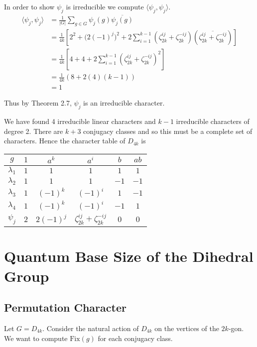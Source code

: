 In order to show $\psi_j$ is irreducible we compute $\langle \psi_j, \psi_j \rangle$.
\begin{align*}
    \langle \psi_j, \psi_j \rangle &= \frac{1}{|G|}\sum_{g \in G} \psi_j(g) \overline{\psi_j(g)} \\
                           &= \frac{1}{4k}\left[2^2 + \bigl(2(-1)^j\bigr)^2 + 
                               2\sum_{i=1}^{k-1}\left(\zeta_{2k}^{ij} + 
                               \zeta_{2k}^{-ij}\right)\left(\overline{\zeta_{2k}^{ij} + 
                       \zeta_{2k}^{-ij}}\right)\right] \\
%                             
               &= \frac{1}{4k}\left[ 4 + 4 + 2\sum_{i=1}^{k-1}\left(\zeta_{2k}^{ij} + \zeta_{2k}^{-ij}\right)^2 
               \right] \\
               &= \frac{1}{4k}(8 + 2(4)(k-1)) \\
               &= 1 \end{align*}

Thus by Theorem 2.7, $\psi_j$ is an irreducible character. 

We have found 4 irreducible linear characters and $k-1$ irreducible characters of degree 2. There are $k+3$ 
conjugacy classes and so this must be a complete set of characters. Hence the character table of $D_{4k}$ is 

\begin{center}
\begin{tabular}{c|ccccc}
    $g$ &$1$ & $a^k$ & $a^i$ & $b$ & $ab$ \\ \hline
    $\lambda_1$ & $1$ & $1$ & $1$ & $1$ & $1$ \\
    $\lambda_2$ & $1$ & $1$ & $1$ & $-1$ & $-1$ \\
    $\lambda_3$ & $1$ & $(-1)^k$ & $(-1)^i$ & $1$ & $-1$ \\
    $\lambda_4$ & $1$ & $(-1)^k$ & $(-1)^i$ & $-1$ & $1$ \\
    $\psi_j$ & $2$ & $2(-1)^j$ & $\zeta_{2k}^{ij} + \zeta_{2k}^{-ij}$ & $0$ & $0$
\end{tabular}
\end{center}

\section{Quantum Base Size of the Dihedral Group}




\subsection{Permutation Character}
Let $G = D_{4k}$. Consider the natural action of $D_{4k}$ on the vertices of the $2k$-gon. We want to compute 
$\text{Fix}(g)$ for each conjugacy class.


